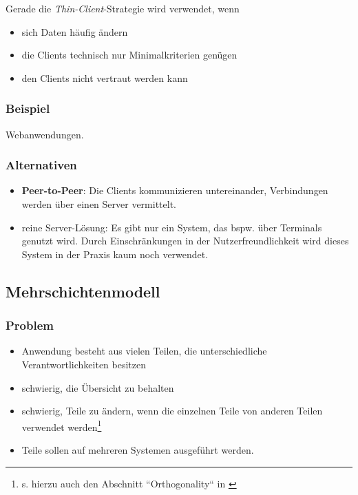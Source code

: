 Gerade die \textit{Thin-Client}-Strategie wird verwendet, wenn

\begin{itemize}
    \item sich Daten häufig ändern
    \item die Clients technisch nur Minimalkriterien genügen
    \item den Clients nicht vertraut werden kann
\end{itemize}

\subsubsection*{Beispiel}
Webanwendungen.

\subsubsection*{Alternativen}
\begin{itemize}
    \item \textbf{Peer-to-Peer}: Die Clients kommunizieren untereinander, Verbindungen werden über einen Server  vermittelt.
    \item reine Server-Lösung: Es gibt nur ein System, das bspw. über Terminals genutzt wird.
    Durch Einschränkungen in der Nutzerfreundlichkeit wird dieses System in der Praxis kaum noch verwendet.
\end{itemize}


\subsection{Mehrschichtenmodell}

\subsubsection*{Problem}
\begin{itemize}
    \item Anwendung besteht aus vielen Teilen, die unterschiedliche Verantwortlichkeiten besitzen
    \item schwierig, die Übersicht zu behalten
    \item schwierig, Teile zu ändern, wenn die einzelnen Teile von anderen Teilen verwendet werden\footnote{
     s. hierzu auch den Abschnitt ``Orthogonality`` in \cite[39 ff.]{TH19}
    }
    \item Teile sollen auf mehreren Systemen ausgeführt werden.
\end{itemize}

